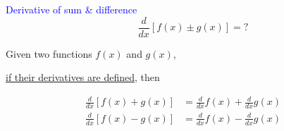 \documentclass[14pt,fleqn]{extarticle}
\begin{document}
 

\begin{skill}
\textcolor{blue}{Derivative of sum \& difference}
\[ \qquad \dfrac{d}{dx} \left[f(x) \pm g(x) \right] = ? \]
\end{skill}

\newcard 

Given two functions $f(x)$ and $g(x)$, 

\underline{if their derivatives are defined}, then

%
\begin{align}
\frac{d}{dx}\left[ f(x) + g(x)\right] &= \frac{d}{dx}f(x) + \frac{d}{dx}g(x) \\
\frac{d}{dx}\left[ f(x) - g(x)\right] &= \frac{d}{dx}f(x) - \frac{d}{dx}g(x)
\end{align}
\end{document}
